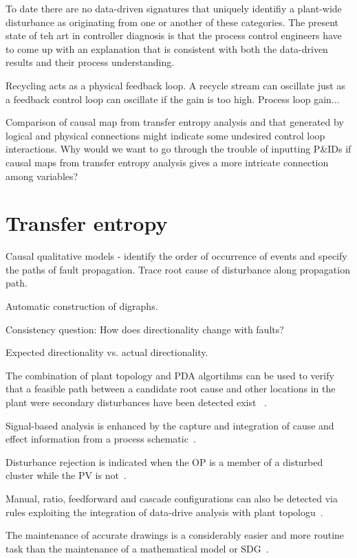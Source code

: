 \documentclass[a4paper]{book}
\begin{document}
To date there are no data-driven signatures that uniquely identifiy a plant-wide disturbance as originating from one or another of these categories.
The present state of teh art in controller diagnosis is that the process control engineers have to come up with an explanation that is consistent with both the data-driven results and their process understanding.

Recycling acts as a physical feedback loop.
A recycle stream can oscillate just as a feedback control loop can oscillate if the gain is too high.
Process loop gain...

Comparison of causal map from transfer entropy analysis and that generated by logical and physical connections might indicate some undesired control loop interactions.
Why would we want to go through the trouble of inputting P\&IDs if causal maps from transfer entropy analysis gives a more intricate connection among variables?


\section{Transfer entropy}


Causal qualitative models - identify the order of occurrence of events and specify the paths of fault propagation.
Trace root cause of disturbance along propagation path.

Automatic construction of digraphs.

Consistency question:
How does directionality change with faults?

Expected directionality vs. actual directionality.

The combination of plant topology and PDA algortihms can be used to verify that a feasible path between a candidate root cause and other locations in the plant were secondary disturbances have been detected exist ~\cite{Yim2006}.

Signal-based analysis is enhanced by the capture and integration of cause and effect information from a process schematic~\cite{Yim2006}.

Disturbance rejection is indicated when the OP is a member of a disturbed cluster while the PV is not~\cite{Yim2006}.

Manual, ratio, feedforward and cascade configurations can also be detected via rules exploiting the integration of data-drive analysis with plant topologu~\cite{Yim2006}.

The maintenance of accurate drawings is a considerably easier and more routine task than the maintenance of a mathematical model or SDG~\cite{Yim2006}.
\end{document}
